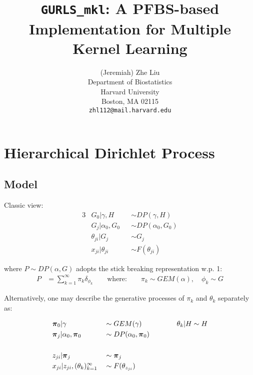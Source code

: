 \documentclass{article} %
\title{{\tt GURLS\_mkl}: A PFBS-based Implementation for Multiple Kernel Learning}
\author{
(Jeremiah) Zhe Liu \\
Department of Biostatistics\\
Harvard University\\
Boston, MA 02115 \\
\texttt{zhl112@mail.harvard.edu} 
}
\begin{document}
\maketitle
\vspace*{-4em}
\tableofcontents
\thispagestyle{empty}
\newpage
\setcounter{page}{1}



\section{Hierarchical Dirichlet Process}

\subsection{Model}

Classic view:
\begin{alignat*}{3}
& G_0 | \gamma, H && \sim DP(\gamma, H) \\
& G_j | \alpha_0, G_0 && \sim DP(\alpha_0, G_0) \\
& \theta_{ji} | G_j && \sim G_j \\
& x_{ji} | \theta_{ji} && \sim F(\theta_{ji})
\end{alignat*}

where $P \sim DP(\alpha, G)$ adopts the stick breaking representation w.p. 1:
\begin{align*}
P &= \sum_{k=1}^\infty \pi_k \delta_{\phi_k} \qquad \mbox{where:} 
\qquad
\pi_k \sim GEM(\alpha), \quad \phi_k  \sim G
\end{align*}

Alternatively, one may describe the generative processes of $\pi_k$ and $\theta_k$ separately as:

\begin{alignat*}{3}
& \boldsymbol{\pi}_0 | \gamma && \sim GEM(\gamma) 
\qquad\qquad && \theta_k | H \sim H 
\\
& \boldsymbol{\pi}_j | \alpha_0, \boldsymbol{\pi}_0 && \sim DP(\alpha_0, \boldsymbol{\pi}_0) \\ \\
& z_{ji} | \boldsymbol{\pi}_j && \sim \boldsymbol{\pi}_j \\
& 
x_{ji} | z_{ji}, (\theta_{k})_{k=1}^\infty && \sim F(\theta_{z_{ji}})
\end{alignat*}
\end{document}
